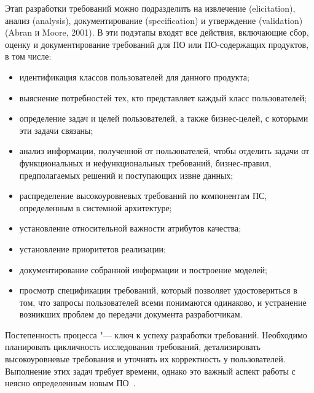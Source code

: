 \documentclass{../industrial-development}
\begin{document}
\lecturenotes

 Этап разработки требований можно подразделить на извлечение (elicitation), анализ (analysis), документирование (specification) и утверждение (validation) (Abran и Moore, 2001). В эти подэтапы входят все действия, включающие сбор, оценку и документирование требований для ПО или ПО-содержащих продуктов, в том числе:
	\begin{itemize}
\item идентификация классов пользователей для данного продукта;
\item выяснение потребностей тех, кто представляет каждый класс пользователей;
\item определение задач и целей пользователей, а также бизнес-целей, с которыми эти задачи связаны;
\item анализ информации, полученной от пользователей, чтобы отделить задачи от функциональных и нефункциональных требований, бизнес-правил, предполагаемых решений и поступающих извне данных;
\item распределение высокоуровневых требований по компонентам ПС, определенным в системной архитектуре;
\item установление относительной важности атрибутов качества;
\item установление приоритетов реализации;
\item документирование собранной информации и построение моделей;
\item просмотр спецификации требований, который позволяет удостовериться в том, что запросы пользователей всеми понимаются одинаково, и устранение возникших проблем до передачи документа разработчикам.
\end{itemize}

Постепенность процесса "--- ключ к успеху разработки требований. Необходимо планировать цикличность исследования требований, детализировать высокоуровневые требования и уточнять их корректность у пользователей. Выполнение этих задач требует времени, однако это важный аспект работы с неясно определенным новым ПО~\cite[с.~12--13]{Wiegers}.
\end{document}
